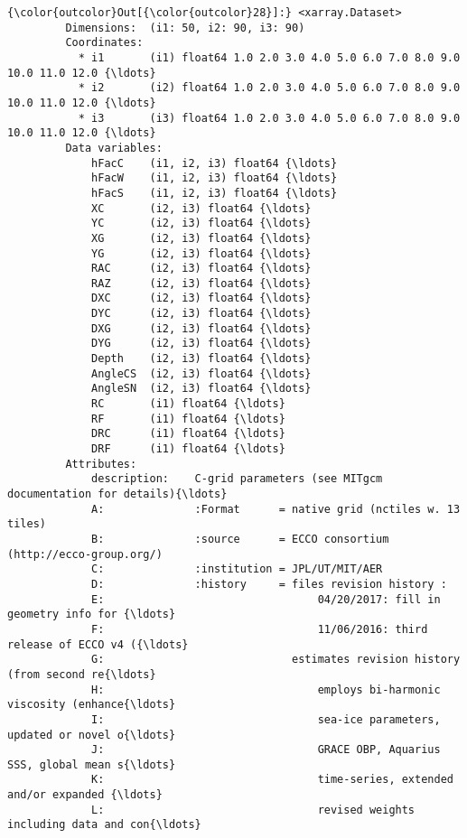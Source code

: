 \documentclass[11pt]{article}
\begin{document}
\begin{Verbatim}[commandchars=\\\{\}]
{\color{outcolor}Out[{\color{outcolor}28}]:} <xarray.Dataset>
         Dimensions:  (i1: 50, i2: 90, i3: 90)
         Coordinates:
           * i1       (i1) float64 1.0 2.0 3.0 4.0 5.0 6.0 7.0 8.0 9.0 10.0 11.0 12.0 {\ldots}
           * i2       (i2) float64 1.0 2.0 3.0 4.0 5.0 6.0 7.0 8.0 9.0 10.0 11.0 12.0 {\ldots}
           * i3       (i3) float64 1.0 2.0 3.0 4.0 5.0 6.0 7.0 8.0 9.0 10.0 11.0 12.0 {\ldots}
         Data variables:
             hFacC    (i1, i2, i3) float64 {\ldots}
             hFacW    (i1, i2, i3) float64 {\ldots}
             hFacS    (i1, i2, i3) float64 {\ldots}
             XC       (i2, i3) float64 {\ldots}
             YC       (i2, i3) float64 {\ldots}
             XG       (i2, i3) float64 {\ldots}
             YG       (i2, i3) float64 {\ldots}
             RAC      (i2, i3) float64 {\ldots}
             RAZ      (i2, i3) float64 {\ldots}
             DXC      (i2, i3) float64 {\ldots}
             DYC      (i2, i3) float64 {\ldots}
             DXG      (i2, i3) float64 {\ldots}
             DYG      (i2, i3) float64 {\ldots}
             Depth    (i2, i3) float64 {\ldots}
             AngleCS  (i2, i3) float64 {\ldots}
             AngleSN  (i2, i3) float64 {\ldots}
             RC       (i1) float64 {\ldots}
             RF       (i1) float64 {\ldots}
             DRC      (i1) float64 {\ldots}
             DRF      (i1) float64 {\ldots}
         Attributes:
             description:    C-grid parameters (see MITgcm documentation for details){\ldots}
             A:              :Format      = native grid (nctiles w. 13 tiles)
             B:              :source      = ECCO consortium (http://ecco-group.org/)
             C:              :institution = JPL/UT/MIT/AER
             D:              :history     = files revision history :
             E:                                 04/20/2017: fill in geometry info for {\ldots}
             F:                                 11/06/2016: third release of ECCO v4 ({\ldots}
             G:                             estimates revision history (from second re{\ldots}
             H:                                 employs bi-harmonic viscosity (enhance{\ldots}
             I:                                 sea-ice parameters, updated or novel o{\ldots}
             J:                                 GRACE OBP, Aquarius SSS, global mean s{\ldots}
             K:                                 time-series, extended and/or expanded {\ldots}
             L:                                 revised weights including data and con{\ldots}

\end{Verbatim}
\end{document}

